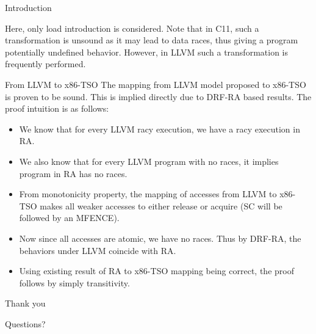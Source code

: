 \documentclass[xcolor=dvipsnames, notes]{beamer}
\begin{document}
    \begin{frame}{Introduction}

        Here, only load introduction is considered. 
        Note that in C11, such a transformation is unsound as it may lead to data races, thus giving a program potentially undefined behavior.
        However, in LLVM such a transformation is frequently performed.

    \end{frame}

    \begin{frame}{From LLVM to x86-TSO}
        The mapping from LLVM model proposed to x86-TSO is proven to be sound.
        This is implied directly due to DRF-RA based results.
        The proof intuition is as follows:
        \begin{itemize}
            \item We know that for every LLVM racy execution, we have a racy execution in RA.
            \item We also know that for every LLVM program with no races, it implies program in RA has no races.
            \item From monotonicity property, the mapping of accesses from LLVM to x86-TSO makes all weaker accesses to either release or acquire (SC will be followed by an MFENCE).
            \item Now since all accesses are atomic, we have no races. Thus by DRF-RA, the behaviors under LLVM coincide with RA.
            \item Using existing result of RA to x86-TSO mapping being correct, the proof follows by simply transitivity. 
        \end{itemize}

    \end{frame}


    \begin{frame}{Thank you}

        Questions?

    \end{frame}
\end{document}
